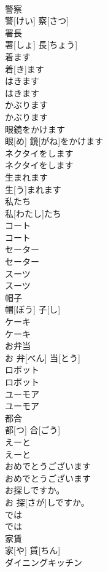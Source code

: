 \documentclass[8pt]{extreport}
\begin{document}
\begin{CJK}{UTF8}{min}
\\	警察	
\\	警[けい] 察[さつ]		
\\	署長	
\\	署[しょ] 長[ちょう]		
\\	着ます	
\\	着[き]ます		
\\	はきます	
\\	はきます		
\\	かぶります	
\\	かぶります		
\\	眼鏡をかけます	
\\	眼[め] 鏡[がね]をかけます		
\\	ネクタイをします	
\\	ネクタイをします		
\\	生まれます	
\\	生[う]まれます		
\\	私たち	
\\	私[わたし]たち		
\\	コート	
\\	コート		
\\	セーター	
\\	セーター		
\\	スーツ	
\\	スーツ		
\\	帽子	
\\	帽[ぼう] 子[し]		
\\	ケーキ	
\\	ケーキ		
\\	お弁当	
\\	お 弁[べん] 当[とう]		
\\	ロボット	
\\	ロボット		
\\	ユーモア	
\\	ユーモア		
\\	都合	
\\	都[つ] 合[ごう]		
\\	えーと	
\\	えーと		
\\	おめでとうございます	
\\	おめでとうございます		
\\	お探しですか。	
\\	お 探[さが]しですか。		
\\	では	
\\	では		
\\	家賃	
\\	家[や] 賃[ちん]		
\\	ダイニングキッチン	

\end{CJK}
\end{document}
